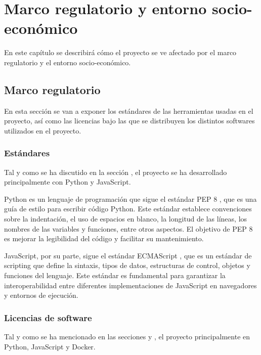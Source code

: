 \chapter{Marco regulatorio y entorno socio-económico}\label{chap:marco-regulador}

En este capítulo se describirá cómo el proyecto se ve afectado por el marco regulatorio y el entorno socio-económico.

\section{Marco regulatorio}\label{sec:marco-regulador}

En esta sección se van a exponer los estándares de las herramientas usadas en el proyecto, así como las licencias bajo las que se distribuyen los distintos softwares utilizados en el proyecto.

\subsection{Estándares}\label{subsec:estandares}
Tal y como se ha discutido en la sección , el proyecto se ha desarrollado principalmente con Python y JavaScript.

Python es un lenguaje de programación que sigue el estándar PEP 8 \cite{pep8}, que es una guía de estilo para escribir código Python. Este estándar establece convenciones sobre la indentación, el uso de espacios en blanco, la longitud de las líneas, los nombres de las variables y funciones, entre otros aspectos. El objetivo de PEP 8 es mejorar la legibilidad del código y facilitar su mantenimiento.

JavaScript, por su parte, sigue el estándar ECMAScript \cite{ecmascript}, que es un estándar de scripting que define la sintaxis, tipos de datos, estructuras de control, objetos y funciones del lenguaje. Este estándar es fundamental para garantizar la interoperabilidad entre diferentes implementaciones de JavaScript en navegadores y entornos de ejecución.

\subsection{Licencias de software}\label{subsec:licencias-software}

Tal y como se ha mencionado en las secciones  y , el proyecto principalmente en Python, JavaScript y Docker.

